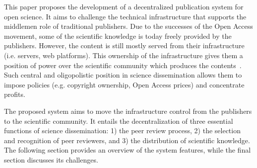 This paper proposes the development of a decentralized publication system for
open science. It aims to challenge the technical infrastructure that supports
the middlemen role of traditional publishers. Due to the successes of the Open
Access movement, some of the scientific knowledge is today freely provided by
the publishers. However, the content is still mostly served from their
infrastructure (i.e. servers, web platforms). This ownership of the
infrastructure gives them a position of power over the scientific community
which produces the contents~\cite{fuster2010governance}. Such central and
oligopolistic position in science dissemination allows them to impose policies
(e.g. copyright ownership, Open Access prices) and concentrate profits.

The proposed system aims to move the infrastructure control from the publishers
to the scientific community. It entails the decentralization of three essential
functions of science dissemination: 1) the peer review process, 2) the selection
and recognition of peer reviewers, and 3) the distribution of scientific
knowledge. The following section provides an overview of the system features,
while the final section discusses its challenges.
